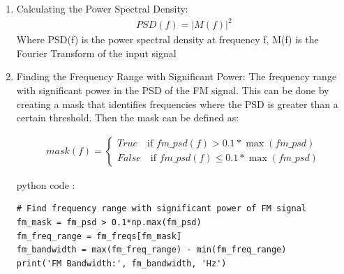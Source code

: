 \documentclass[journal,5pt,twocolumn]{IEEEtran}
\begin{document}
\begin{enumerate}
\item Calculating the Power Spectral Density:
\begin{align*}
PSD(f)=\lvert M(f) \rvert^2 
\end{align*}
Where PSD(f) is the power spectral density at frequency f, M(f) is the Fourier Transform of the input signal

\item Finding the Frequency Range with Significant Power:
The frequency range with significant power in the PSD of the FM signal. This can be done by creating a mask that identifies frequencies where the PSD is greater than a certain threshold. Then the mask can be defined as:

\begin{align*}
mask(f) = 
    \begin{cases}
        True \quad \text{if } fm\_psd(f) > 0.1 * \max(fm\_psd) \\
        False \quad \text{if } fm\_psd(f) \leq 0.1 * \max(fm\_psd)
    \end{cases}
\end{align*}

python code  :\\
\begin{lstlisting}
# Find frequency range with significant power of FM signal
fm_mask = fm_psd > 0.1*np.max(fm_psd)
fm_freq_range = fm_freqs[fm_mask]
fm_bandwidth = max(fm_freq_range) - min(fm_freq_range)
print('FM Bandwidth:', fm_bandwidth, 'Hz')
\end{lstlisting}







\end{enumerate}
\end{document}
